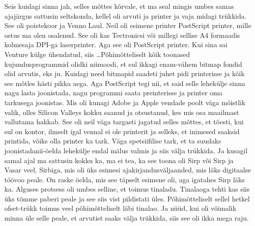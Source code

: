 
Seis kuidagi sinna jah, selles mõttes kõrvale, et ma seal mingis umbes samas ajajärgus sattusin seltskonda, kellel oli arvuti ja printer ja vaja  midagi trükkida. See oli poistekoor ja Venno Laul. Neil oli esimene printer PostScript printer, mille ostus ma olen osalenud. See oli kas Tectronicsi või millegi sellise A4 formaadis kolmesaja DPI-ga laserprinter. Aga see oli PostScript printer. Kui sina sai Venture külge ühendatud, siis \ldots Põhimõtteliselt kõik toonased kujundusprogrammid olidki niimoodi, et sul ikkagi enam-vähem bitmap fondid olid arvutis, eks ju. Kuidagi need bitmapid saadeti juhet pidi printerisse ja kõik see mõtles hästi pikka aega. Aga PostScript tegi nii, et said selle lehekülje sinna nagu lasta joonistada, nagu programmi saata preinterisse ja printer oma tarkusega joonistas. Mis oli kunagi  Adobe ja Apple vendade poolt väga mõistlik valik, olles Silicon Valleys kokku saanud ja  otsustanud, kes mis osa maailmast vallutama hakkab. See oli neil väga targasti jagatud selles mõttes, et tõesti, kui sul on kontor, ilmselt igal vennal ei ole printerit ja selleks, et inimesed saaksid printida, võiks olla printer ka tark. Väga spetsiifilise tark, et ta suudaks joonistadanii-öelda lehekülje endal mälus valmis ja siis välja trükkida. Ja kusagil samal ajal ma sattusin kokku ka, ma ei tea, ka see toona oli Sirp või Sirp ja Vasar veel, Sirbiga, mis oli üks esimesi ajakirjandusväljaanded, mis läks digitaalse töövoo peale. On raske öelda, mis see täpselt esimene oli, aga igatahes Sirp läks ka. Alguses protsess oli umbes selline, et toimus tinaladu. Tinalaoga tehti kas siis üks tõmme paberi peale ja see siis vist pildistati üles. Põhimõtteliselt sellel hetkel ofset-trükk toimus veel põhimõtteliselt läbi tinalao. Ja nüüd, kui oli võimalik minna üle selle peale, et arvutist saaks välja trükkida, siis see oli ikka mega raju.


